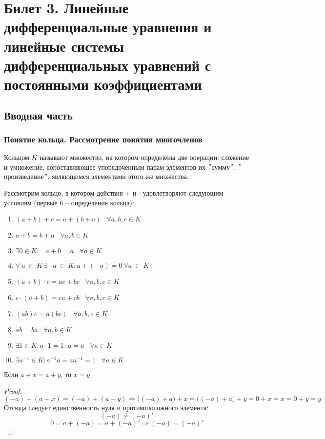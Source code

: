 
\section{Билет 3. Линейные дифференциальные уравнения и линейные системы дифференциальных уравнений с постоянными коэффициентами}

\subsection{Вводная часть}
\subsubsection{Понятие кольца. Рассмотрение понятия многочленов}

\begin{definition}
Кольцом $K$ называют множество, на котором определены две операции: сложение и умножение, сопоставляющее упорядоченным парам элементов их $"$сумму$"$, $"$произведение$"$, являющимся элементами этого же множества.
\end{definition}
Рассмотрим кольцо, в котором действия $+$ и $\cdot$ удовлетворяют следующим условиям (первые $6$ -- определение кольца):
\begin{enumerate}
    \item $(a+b)+c=a+(b+c)\;\;\;\forall a, b, c \in K$
    \item $a+b=b+a\;\;\;\forall a, b\in K$
    \item $\exists 0\in K:\;\;\; a+0=a \;\;\;\forall a\in K$
    \item $\forall ~ a ~ \in ~ K ~ \exists -a ~ \in ~ K: a+(-a)=0 ~ \forall a ~\in ~ K$
    \item $(a+b) \cdot c = ac + bc \;\;\; \forall a, b, c \in K$
    \item $c\cdot(a+b)=ca+cb\;\;\; \forall a, b, c\in K$
    \item $(ab)c=a(bc)\;\;\; \forall a, b, c\in K$
    \item $ab=ba \;\;\;\forall a, b\in K$
    \item $\exists 1\in K: a\cdot 1 =1\cdot a = a\;\;\;\forall a\in K$
    \item $\exists a^{-1} \in K: a^{-1}a=aa^{-1}=1\;\;\;\forall a\in K$
\end{enumerate}
\begin{proposition}
Если $a+x=a+y$, то $x=y$
\end{proposition}
\begin{proof}
$$(-a)+(a+x)=(-a)+(a+y)\Rightarrow \big((-a)+a\big) +x= \big((-a)+a\big) +y=0+x=x=0+y=y$$
Отсюда следует единственность нуля и противоположного элемента:
$$(-a)\neq (-a)'$$$$0=a+(-a)=a+(-a)'\Rightarrow(-a)=(-a)'$$
\end{proof}
